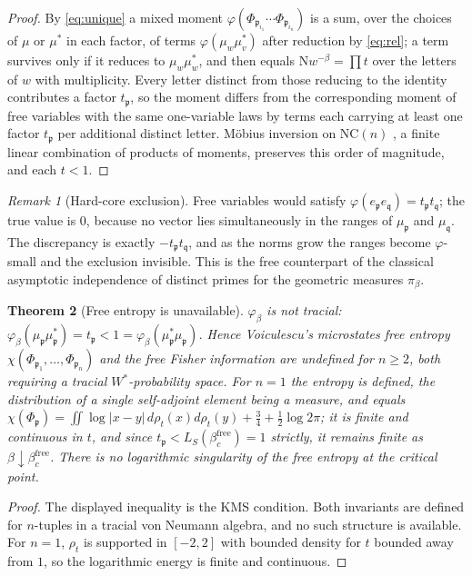 \documentclass[11pt]{amsart}
\numberwithin{equation}{section}
\newtheorem{theorem}{Theorem}[section]
\theoremstyle{definition}
\theoremstyle{remark}
\newtheorem{remark}[theorem]{Remark}
\newcommand{\pp}{\mathfrak{p}}
\newcommand{\qq}{\mathfrak{q}}
\newcommand{\Ns}{\mathrm{N}}
\newcommand{\NC}{\mathrm{NC}}
\newcommand{\bfree}{\beta_c^{\mathrm{free}}}
\begin{document}
\begin{proof}
By \eqref{eq:unique} a mixed moment $\varphi(\Phi_{\pp_{i_1}}\cdots\Phi_{\pp_{i_n}})$ is a sum,
over the choices of $\mu$ or $\mu^*$ in each factor, of terms $\varphi(\mu_w\mu_v^*)$ after
reduction by \eqref{eq:rel}; a term survives only if it reduces to $\mu_w\mu_w^*$, and then
equals $\Ns w^{-\beta}=\prod t$ over the letters of $w$ with multiplicity. Every letter
distinct from those reducing to the identity contributes a factor $t_\pp$, so the moment
differs from the corresponding moment of free variables with the same one-variable laws by
terms each carrying at least one factor $t_\pp$ per additional distinct letter. Möbius
inversion on $\NC(n)$ \cite{NS}, a finite linear combination of products of moments,
preserves this order of magnitude, and each $t<1$.
\end{proof}

\begin{remark}[Hard-core exclusion]\label{rem:hardcore}
Free variables would satisfy $\varphi(e_\pp e_\qq)=t_\pp t_\qq$; the true value is $0$,
because no vector lies simultaneously in the ranges of $\mu_\pp$ and $\mu_\qq$. The
discrepancy is exactly $-t_\pp t_\qq$, and as the norms grow the ranges become
$\varphi$-small and the exclusion invisible. This is the free counterpart of the classical
asymptotic independence of distinct primes for the geometric measures $\pi_\beta$.
\end{remark}

\begin{theorem}[Free entropy is unavailable]\label{thm:nochi}
$\varphi_\beta$ is not tracial: $\varphi_\beta(\mu_\pp\mu_\pp^*)=t_\pp<1=\varphi_\beta(\mu_\pp^*\mu_\pp)$.
Hence Voiculescu's microstates free entropy $\chi(\Phi_{\pp_1},\dots,\Phi_{\pp_n})$
\cite{Voi94} and the free Fisher information are undefined for $n\ge2$, both requiring a
tracial $W^*$-probability space. For $n=1$ the entropy is defined, the distribution of a single
self-adjoint element being a measure, and equals
$\chi(\Phi_\pp)=\iint\log|x-y|\,d\rho_t(x)d\rho_t(y)+\tfrac34+\tfrac12\log2\pi$; it is finite
and continuous in $t$, and since $t_\pp<L_S(\bfree)=1$ strictly, it remains finite as
$\beta\downarrow\bfree$. There is no logarithmic singularity of the free entropy at the
critical point.
\end{theorem}

\begin{proof}
The displayed inequality is the KMS condition. Both invariants are defined for $n$-tuples in
a tracial von Neumann algebra, and no such structure is available. For $n=1$, $\rho_t$ is
supported in $[-2,2]$ with bounded density for $t$ bounded away from $1$, so the logarithmic
energy is finite and continuous.
\end{proof}
\end{document}
